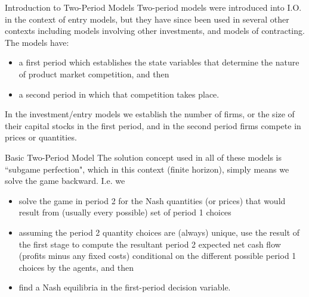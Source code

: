 \begin{frame}{Introduction to Two-Period Models}
Two-period models were introduced into I.O. in the context of
entry models, but they have since been used in several other contexts including models involving other investments, and models
of contracting. The models have:
\begin{itemize}
\item  a first period which establishes the state variables that determine the nature of product market competition, and then
\item a second period in which that competition takes place.
\end{itemize}

In the investment/entry models we establish the number of
firms, or the size of their capital stocks in the first period, and
in the second period firms compete in prices or quantities.

\end{frame}

\begin{frame}{Basic Two-Period Model}
The solution concept used in all of these models is ``subgame
perfection", which in this context (finite horizon), simply means
we solve the game backward. I.e. we
\begin{itemize}
\item solve the game in period 2 for the Nash quantities (or
prices) that would result from (usually every possible) set
of period 1 choices
\item assuming the period 2 quantity choices are (always) unique,
use the result of the first stage to compute the resultant period 2 expected net cash 
flow (profits minus any fixed costs) conditional on the different possible period 1 choices
by the agents, and then
\item find a Nash equilibria in the first-period decision variable.
\end{itemize}
\end{frame}


